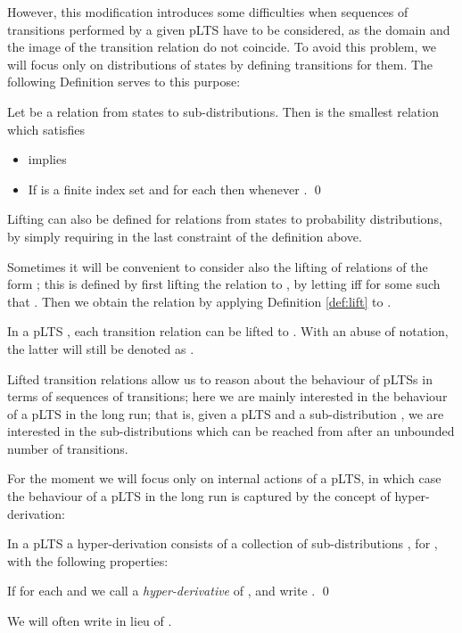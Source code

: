 \documentclass{LMCS}
\begin{document}
However, this modification introduces some difficulties when sequences of transitions performed by a 
given pLTS have to be considered, as the domain and the image of the transition relation do not 
coincide. To avoid this problem, we will focus only on distributions of states by defining 
transitions for them. The following Definition serves to this purpose:
\begin{defi}
\label{def:lift}
Let  be a relation from states to 
 sub-distributions. Then
 is the smallest relation which satisfies 
\begin{itemize}
\item  implies 

\item If  is a finite index set and  for each  then
       whenever 
       .  \qed
\end{itemize}
\end{defi}
\noindent 
Lifting can also be defined for relations from states to probability distributions, 
by simply requiring  in the last constraint of the definition above.

Sometimes it will be convenient to consider also the lifting 
of relations of the form ; 
this is defined by first lifting the relation 
 to , 
by letting  iff  for some  such that 
. Then we obtain the relation  by 
applying Definition \ref{def:lift} to .

In a pLTS , each transition relation 
 can be lifted to
. 
With an abuse of notation, the latter will still be denoted as .

Lifted transition relations allow us to reason about the behaviour of pLTSs in terms of 
sequences of transitions; here we are mainly interested in the behaviour of a pLTS in 
the long run; that is, given a pLTS  
and a sub-distribution , we are interested in the sub-distributions 
 which can be reached from  after an unbounded 
number of transitions. 

For the moment we will focus only on internal actions of 
a pLTS, in which case the behaviour of a pLTS in the long run is captured by the 
concept of hyper-derivation:
\begin{defi}
\label{def:hypder}
  In a  pLTS a hyper-derivation consists of a collection of sub-distributions
, for ,
with the following properties:

 If  for each   and 
we call  a
\emph{hyper-derivative} of , and write
.
\qed
\end{defi}
\noindent
We will often write  in lieu of .
\end{document}
